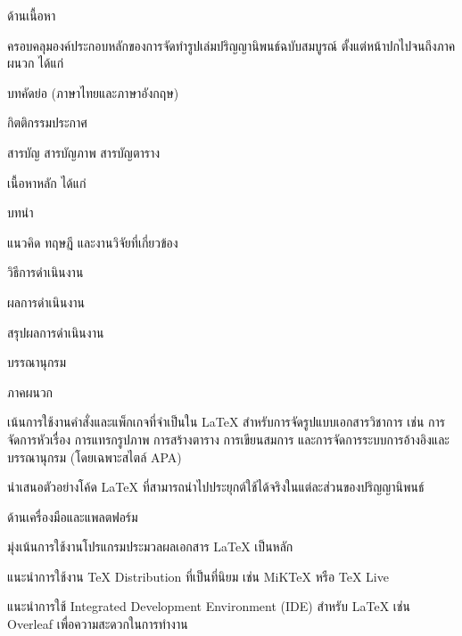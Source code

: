 \begin{mycustomenum2}
    \item ด้านเนื้อหา
    \begin{mycustomenum2}
        \item ครอบคลุมองค์ประกอบหลักของการจัดทำรูปเล่มปริญญานิพนธ์ฉบับสมบูรณ์ ตั้งแต่หน้าปกไปจนถึงภาคผนวก ได้แก่
        \begin{mycustomenum2}
            \item บทคัดย่อ (ภาษาไทยและภาษาอังกฤษ)
            \item กิตติกรรมประกาศ
            \item สารบัญ สารบัญภาพ สารบัญตาราง
            \item เนื้อหาหลัก ได้แก่ 
            \begin{mycustomenum2}
                \item บทนำ
                \item แนวคิด ทฤษฎี และงานวิจัยที่เกี่ยวข้อง
                \item วิธีการดำเนินงาน
                \item ผลการดำเนินงาน
                \item สรุปผลการดำเนินงาน
            \end{mycustomenum2}            
            \item บรรณานุกรม
            \item ภาคผนวก
        \end{mycustomenum2}
        \item เน้นการใช้งานคำสั่งและแพ็กเกจที่จำเป็นใน LaTeX สำหรับการจัดรูปแบบเอกสารวิชาการ เช่น การจัดการหัวเรื่อง การแทรกรูปภาพ การสร้างตาราง การเขียนสมการ และการจัดการระบบการอ้างอิงและบรรณานุกรม (โดยเฉพาะสไตล์ APA)
        \item นำเสนอตัวอย่างโค้ด LaTeX ที่สามารถนำไปประยุกต์ใช้ได้จริงในแต่ละส่วนของปริญญานิพนธ์
    \end{mycustomenum2}

    \item ด้านเครื่องมือและแพลตฟอร์ม
    \begin{mycustomenum2}
        \item มุ่งเน้นการใช้งานโปรแกรมประมวลผลเอกสาร LaTeX เป็นหลัก
        \item แนะนำการใช้งาน TeX Distribution ที่เป็นที่นิยม เช่น MiKTeX หรือ TeX Live
        \item แนะนำการใช้ Integrated Development Environment (IDE) สำหรับ LaTeX เช่น Overleaf เพื่อความสะดวกในการทำงาน
    \end{mycustomenum2}
\end{mycustomenum2}


